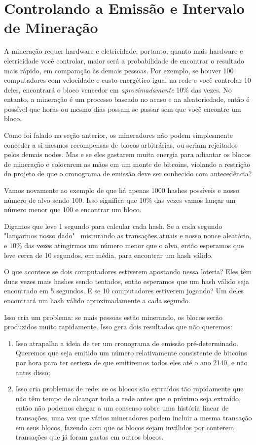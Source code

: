 \section*{Controlando a Emissão e Intervalo de Mineração}


A mineração requer hardware e eletricidade, portanto, quanto mais hardware e eletricidade você controlar, maior será a probabilidade de encontrar o resultado mais rápido, em comparação às demais pessoas. Por exemplo, se houver 100 computadores com velocidade e custo energético igual na rede e você controlar 10 deles, encontrará o bloco vencedor em \textit{aproximadamente} 10\% das vezes. No entanto, a mineração é um processo baseado no acaso e na aleatoriedade, então é possível que horas ou mesmo dias possam se passar sem que você encontre um bloco.

Como foi falado na seção anterior, os mineradores não podem simplesmente conceder a si mesmos recompensas de blocos arbitrárias, ou seriam rejeitados pelos demais nodes. Mas e se eles gastarem muita energia para adiantar os blocos de mineração e colocarem as mãos em um monte de bitcoins, violando a restrição do projeto de que o cronograma de emissão deve ser conhecido com antecedência?

Vamos novamente ao exemplo de que há apenas 1000 hashes possíveis e nosso número de alvo sendo 100. Isso significa que 10\% das vezes vamos lançar um número menor que 100 e encontrar um bloco.

Digamos que leve 1 segundo para calcular cada hash. Se a cada segundo "lançarmos nosso dado" \  misturando as transações atuais e nosso nonce aleatório, e 10\% das vezes atingirmos um número menor que o alvo, então esperamos que leve cerca de 10 segundos, em média, para encontrar um hash válido.

O que acontece se dois computadores estiverem apostando nessa loteria? Eles têm duas vezes mais hashes sendo tentados, então esperamos que um hash válido seja encontrado em 5 segundos. E se 10 computadores estiverem jogando? Um deles encontrará um hash válido aproximadamente a cada segundo.

Isso cria um problema: se mais pessoas estão minerando, os blocos serão produzidos muito rapidamente. Isso gera dois resultados que não queremos:

\begin{enumerate}
\item Isso atrapalha a ideia de ter um cronograma de emissão pré-determinado. Queremos que seja emitido um número relativamente consistente de bitcoins por hora para ter certeza de que emitiremos todos eles até o ano 2140, e não antes disso;
\item Isso cria problemas de rede: se os blocos são extraídos tão rapidamente que não têm tempo de alcançar toda a rede antes que o próximo seja extraído, então não podemos chegar a um consenso sobre uma história linear de transações, uma vez que vários mineradores podem incluir a mesma transação em seus blocos, fazendo com que os blocos sejam inválidos por conterem transações que já foram gastas em outros blocos.
\end{enumerate}

